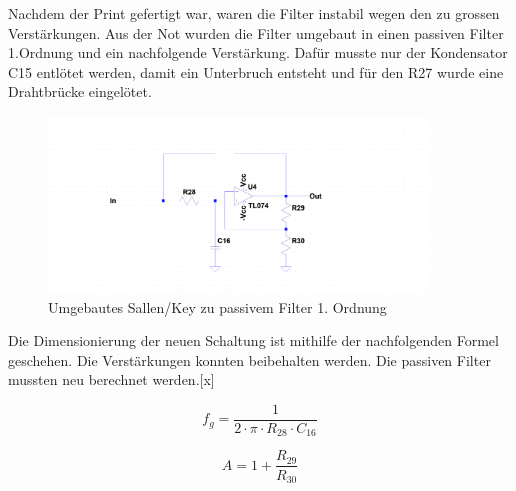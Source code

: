 \begin{minipage}[h]{0.5\textwidth}
Nachdem der Print gefertigt war, waren die Filter instabil wegen den zu grossen Verstärkungen. Aus der Not wurden die Filter umgebaut in einen passiven Filter 1.Ordnung und ein nachfolgende Verstärkung. Dafür musste nur der Kondensator C15 entlötet werden, damit ein Unterbruch entsteht und für den R27 wurde eine Drahtbrücke eingelötet.
\end{minipage}
\begin{minipage}[h]{0.5\textwidth} 
\begin{figure}[H]
\begin{center}
\includegraphics[width=0.9\textwidth]{images/Analoge_Schaltung_Sallentopassive.png}
\caption{Umgebautes Sallen/Key zu passivem Filter 1. Ordnung}
\end{center}
\end{figure}
\end{minipage}

Die Dimensionierung der neuen Schaltung ist mithilfe der nachfolgenden Formel geschehen. Die Verstärkungen konnten beibehalten werden. Die passiven Filter mussten neu berechnet werden.[x]

\begin{minipage}[h]{0.5\textwidth}
\begin{equation}
f_g=\frac{1}{2 \cdot \pi \cdot R_{28} \cdot C_{16}}
\label{eq:Wellenlänge}
\end{equation}

\end{minipage}
\begin{minipage}[h]{0.5\textwidth} 
\begin{equation}
A=1+\frac{R_{29}}{R_{30}}
\label{eq:Wellenlänge}
\end{equation}
\end{minipage}

